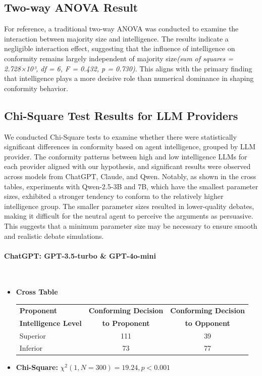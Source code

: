 \documentclass[11pt]{article}
\begin{document}
\subsection{Two-way ANOVA Result}

For reference, a traditional two-way ANOVA was conducted to examine the interaction between majority size and intelligence. The results indicate a negligible interaction effect, suggesting that the influence of intelligence on conformity remains largely independent of majority size\textit{(sum of squares = 2.728×10³, df = 6, F = 0.432, p = 0.730)}. This aligns with the primary finding that intelligence plays a more decisive role than numerical dominance in shaping conformity behavior.

\onecolumn
\subsection{Chi-Square Test Results for LLM Providers}
We conducted Chi-Square tests to examine whether there were statistically significant differences in conformity based on agent intelligence, grouped by LLM provider. The conformity patterns between high and low intelligence LLMs for each provider aligned with our hypothesis, and significant results were observed across models from ChatGPT, Claude, and Qwen. Notably, as shown in the cross tables, experiments with Qwen-2.5-3B and 7B, which have the smallest parameter sizes, exhibited a stronger tendency to conform to the relatively higher intelligence group. The smaller parameter sizes resulted in lower-quality debates, making it difficult for the neutral agent to perceive the arguments as persuasive. This suggests that a minimum parameter size may be necessary to ensure smooth and realistic debate simulations.

\setlength{\tabcolsep}{4pt}  
\paragraph{ChatGPT: GPT-3.5-turbo \& GPT-4o-mini}
\
\begin{itemize}
    \item \textbf{Cross Table} \\[4pt]
    \begin{tabular}{l|cc}
        \hline
        \textbf{Proponent} & \textbf{Conforming Decision} & \textbf{Conforming Decision} \\
        \textbf{Intelligence Level} & \textbf{to Proponent} & \textbf{to Opponent} \\
        \hline
        Superior & 111 &39 \\
        Inferior & 73 & 77 \\
        \hline
    \end{tabular}
    \item \textbf{Chi-Square:} \(\chi^2(1, N = 300) = 19.24, p < 0.001\)
\end{itemize}
\end{document}
